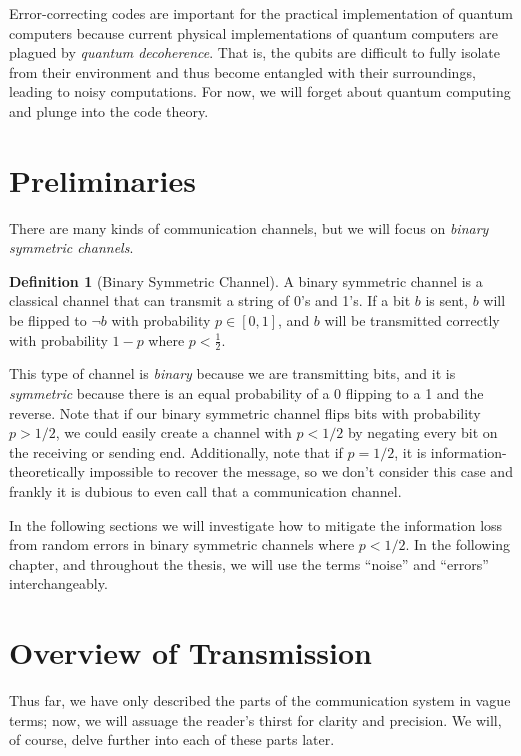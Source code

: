 \documentclass[12pt,twoside]{reedthesis}
\theoremstyle{definition}
\newtheorem{definition}[theorem]{Definition}
\begin{document}
Error-correcting codes are important for the practical implementation of quantum computers because current physical implementations of quantum computers are plagued by \textit{quantum decoherence}. That is, the qubits are difficult to fully isolate from their environment and thus become entangled with their surroundings, leading to noisy computations. For now, we will forget about quantum computing and plunge into the code theory.

\section{Preliminaries}
There are many kinds of communication channels, but we will focus on \textit{binary symmetric channels}. 

\begin{definition}[Binary Symmetric Channel] A binary symmetric channel is a classical channel that can transmit a string of 0's and 1's. If a bit $b$ is sent, $b$ will be flipped to $\lnot b$ with probability $p \in [0,1]$, and $b$ will be transmitted correctly with probability $1-p$ where $p < \frac{1}{2}$.
\end{definition}

This type of channel is \textit{binary} because we are transmitting bits, and it is \textit{symmetric} because there is an equal probability of a 0 flipping to a 1 and the reverse. Note that if our binary symmetric channel flips bits with probability $p > 1/2$, we could easily create a channel with $p <1/2$ by negating every bit on the receiving or sending end. Additionally, note that if $p=1/2$, it is  information-theoretically impossible to recover the message, so we don't consider this case and frankly it is dubious to even call that a communication channel.

In the following sections we will investigate how to mitigate the information loss from random errors in binary symmetric channels where $p<1/2$. In the following chapter, and throughout the thesis, we will use the terms ``noise'' and ``errors'' interchangeably.

\section{Overview of Transmission}

Thus far, we have only described the parts of the communication system in vague terms; now, we will assuage the reader's thirst for clarity and precision. We will, of course, delve further into each of these parts later.
\end{document}
